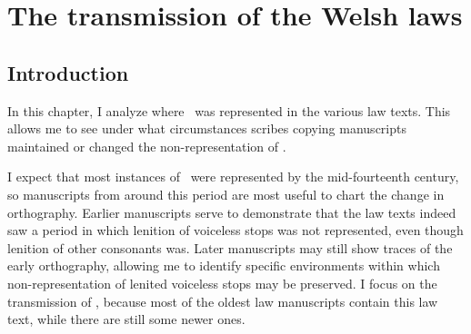 
\chapter{The transmission of the Welsh laws}
\label{cha:welsh-laws}



% 



\section{Introduction}
\label{sec:introduction}

In this chapter, I analyze where \lT\ was represented in the various law texts.
This allows me to see under what circumstances scribes copying manuscripts maintained or changed the non-representation of \lT.

I expect that most instances of \lT\ were represented by the mid-fourteenth century, so manuscripts from around this period are most useful to chart the change in orthography.
Earlier manuscripts serve to demonstrate that the law texts indeed saw a period in which lenition of voiceless stops was not represented, even though lenition of other consonants was.
 Later manuscripts may still show traces of the early orthography, allowing me to identify specific environments within which non-representation of lenited voiceless stops may be preserved.
 I focus on the transmission of , because most of the oldest law manuscripts contain this law text, while there are still some newer ones.


